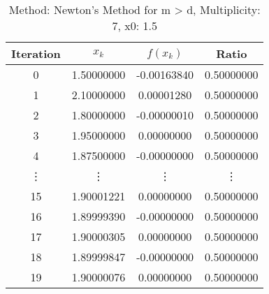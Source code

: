\begin{table}
\centering
\caption{Method: Newton's Method for m > d, Multiplicity: 7, x0: 1.5}
\label{tab:table_Newton's_Method_for_m_>_d_7_1_5}
\begin{tabular}{c c c c}
\toprule
Iteration &      $x_k$ &    $f(x_k)$ &      Ratio \\
\midrule
        0 & 1.50000000 & -0.00163840 & 0.50000000 \\
        1 & 2.10000000 &  0.00001280 & 0.50000000 \\
        2 & 1.80000000 & -0.00000010 & 0.50000000 \\
        3 & 1.95000000 &  0.00000000 & 0.50000000 \\
        4 & 1.87500000 & -0.00000000 & 0.50000000 \\
   \vdots &     \vdots &      \vdots &     \vdots \\
       15 & 1.90001221 &  0.00000000 & 0.50000000 \\
       16 & 1.89999390 & -0.00000000 & 0.50000000 \\
       17 & 1.90000305 &  0.00000000 & 0.50000000 \\
       18 & 1.89999847 & -0.00000000 & 0.50000000 \\
       19 & 1.90000076 &  0.00000000 & 0.50000000 \\
\bottomrule
\end{tabular}
\end{table}
